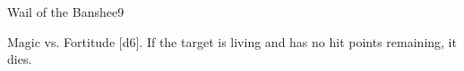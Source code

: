 \begin{spellsection}{Wail of the Banshee}{9}
    \begin{spellheader}
    \end{spellheader}
    \begin{spellcontent}
        \begin{spelltargetinginfo}
        \end{spelltargetinginfo}
        \begin{spelleffects}
            \begin{spellattack}{Magic vs. Fortitude}
                \spellsuccess {}[d6]. If the target is living and has no hit points remaining, it dies.
            \end{spellattack}
        \end{spelleffects}
    \end{spellcontent}
    \begin{spellfooter}
        \miscastexplode
    \end{spellfooter}
\end{spellsection}

